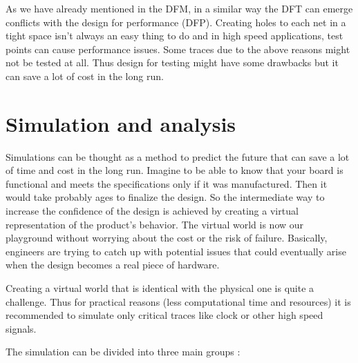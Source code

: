 \documentclass[final]{cubedoc}
\begin{document}
	
	
	As we have already mentioned in the DFM, in a similar way the DFT can emerge conflicts with the design for performance (DFP). Creating holes to each net in a tight space isn't always an easy thing to do and in high speed applications, test points can cause performance issues. Some traces due to the above reasons might not be tested at all. Thus design for testing might have some drawbacks but it can save a lot of cost in the long run. 
	
	
	
	\section{Simulation and analysis}
	
	Simulations can be thought as a method to predict the future that can save a lot of time and cost in the long run. Imagine to be able to know that your board is functional and meets the specifications only if it was manufactured. Then it would take probably ages to finalize the design. So the intermediate way to increase the confidence of the design is achieved by creating a virtual representation of the product's behavior. The virtual world is now our playground without worrying about the cost or the risk of failure. Basically, engineers are trying to catch up with potential issues that could eventually arise when the design becomes a real piece of hardware.
	
	Creating a virtual world that is identical with the physical one is quite a challenge. Thus for practical reasons (less computational time and resources) it is recommended to simulate only critical traces like clock or other high speed signals.
	
	The simulation can be divided into three main groups \cite{bogatin2009signal, sigcon:simulation}: 
	
\end{document}
